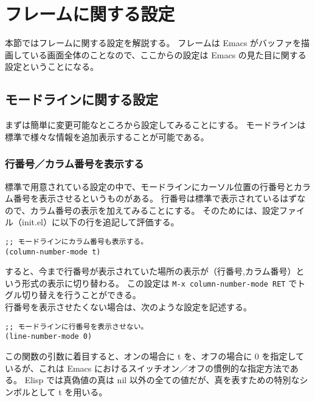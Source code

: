 \section{フレームに関する設定}
本節ではフレームに関する設定を解説する。
フレームは Emacs がバッファを描画している画面全体のことなので、ここからの設定は Emacs の見た目に関する設定ということになる。
\subsection{モードラインに関する設定}
まずは簡単に変更可能なところから設定してみることにする。
モードラインは標準で様々な情報を追加表示することが可能である。
\subsubsection{行番号／カラム番号を表示する}
標準で用意されている設定の中で、モードラインにカーソル位置の行番号とカラム番号を表示させるというものがある。
行番号は標準で表示されているはずなので、カラム番号の表示を加えてみることにする。
そのためには、設定ファイル（init.el）に以下の行を追記して評価する。
\begin{mdframed}[roundcorner=0.50zw,leftmargin=3.00zw,rightmargin=3.00zw,skipabove=0.40zw,skipbelow=0.40zw,innertopmargin=4.00pt,innerbottommargin=4.00pt,innerleftmargin=5.00pt,innerrightmargin=5.00pt,linecolor=gray!020,linewidth=0.50pt,backgroundcolor=gray!20]
\begin{verbatim}
;; モードラインにカラム番号も表示する。
(column-number-mode t)
\end{verbatim}
\end{mdframed}
すると、今まで行番号が表示されていた場所の表示が（行番号,カラム番号）という形式の表示に切り替わる。
この設定は \texttt{M-x column-number-mode RET} でトグル切り替えを行うことができる。\\

行番号を表示させたくない場合は、次のような設定を記述する。
\begin{mdframed}[roundcorner=0.50zw,leftmargin=3.00zw,rightmargin=3.00zw,skipabove=0.40zw,skipbelow=0.40zw,innertopmargin=4.00pt,innerbottommargin=4.00pt,innerleftmargin=5.00pt,innerrightmargin=5.00pt,linecolor=gray!020,linewidth=0.50pt,backgroundcolor=gray!20]
\begin{verbatim}
;; モードラインに行番号を表示させない。
(line-number-mode 0)
\end{verbatim}
\end{mdframed}
この関数の引数に着目すると、オンの場合に t を、オフの場合に 0 を指定しているが、これは Emacs におけるスイッチオン／オフの慣例的な指定方法である。
Elisp では真偽値の真は nil 以外の全ての値だが、真を表すための特別なシンボルとして t を用いる。\\

